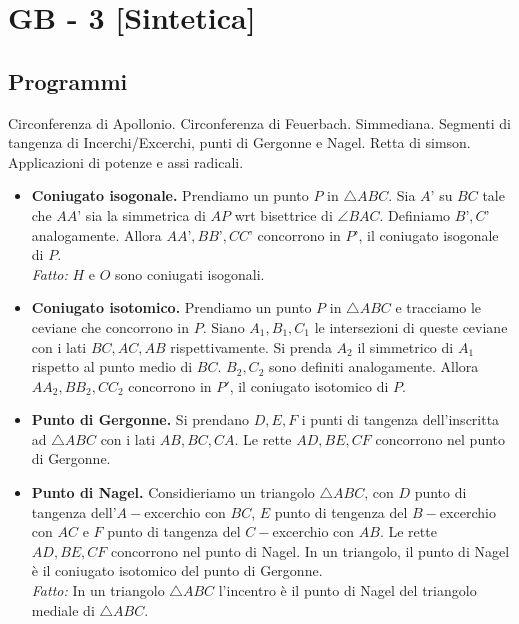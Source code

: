 \section{GB - 3 [Sintetica]}
\subsection{Programmi}
\begin{short}
 Circonferenza di Apollonio. Circonferenza di Feuerbach. Simmediana. Segmenti di tangenza di Incerchi/Excerchi, punti di Gergonne e Nagel. Retta di simson. Applicazioni di potenze e assi radicali. 
\end{short}

\begin{itemize}

\item \textbf{Coniugato isogonale.} Prendiamo un punto $P$ in $\triangle ABC$. Sia $A’$ su $BC$ tale che $AA’$ sia la simmetrica di $AP$ wrt bisettrice di $\angle BAC$. Definiamo $B’,C’$ analogamente. Allora $AA’,BB’,CC’$ concorrono in $P’$, il coniugato isogonale di $P$.\\
\textit{Fatto:} $H$ e $O$ sono coniugati isogonali.\\

\item \textbf{Coniugato isotomico.} Prendiamo un punto $P$ in $\triangle ABC$ e tracciamo le ceviane che concorrono in $P$. Siano $A_1,B_1,C_1$ le intersezioni di queste ceviane con i lati $BC,AC,AB$ rispettivamente. Si prenda $A_2$ il simmetrico di $A_1$ rispetto al punto medio di $BC$. $B_2,C_2$ sono definiti analogamente. Allora $AA_2,BB_2,CC_2$ concorrono in $P'$, il coniugato isotomico di $P$.\\

\item \textbf{Punto di Gergonne.} Si prendano $D,E,F$ i punti di tangenza dell'inscritta ad $\triangle ABC$ con i lati $AB,BC,CA$. Le rette $AD,BE,CF$ concorrono nel punto di Gergonne. 

\item \textbf{Punto di Nagel.} Considieriamo un triangolo $\triangle ABC$, con $D$ punto di tangenza dell'$A-$excerchio con $BC$, $E$ punto di tengenza del $B-$excerchio con $AC$ e $F$ punto di tangenza del $C-$excerchio con $AB$. Le rette $AD,BE,CF$ concorrono nel punto di Nagel. In un triangolo, il punto di Nagel è il coniugato isotomico del punto di Gergonne. \\
\textit{Fatto:} In un triangolo $\triangle ABC$ l'incentro è il punto di Nagel del triangolo mediale di $\triangle ABC$.\\


\end{itemize}
